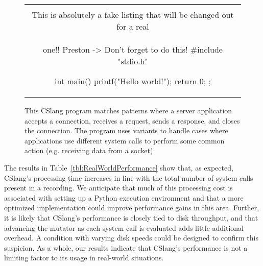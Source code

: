 \begin{figure}[H]
\centering
\begin{tabular}{c}
\begin{lstlisting}
\\ This is absolutely a fake listing that will be changed out for a real
\\ one!!  Preston -> Don't forget to do this!
#include "stdio.h"

int main() {
    printf("Hello world!\n");
    return 0;
};
\end{lstlisting}
\end{tabular}
\caption{This CSlang program matches patterns where a server application
  accepts a connection, receives a request, sends a response, and closes
  the connection.  The program uses variants to handle cases where
  applications use different system calls to perform some common action
  (e.g. receiving data from a socket)}
\label{lst:RealWorldPerformance}
\end{figure}

The results in Table~\ref{tbl:RealWorldPerformance} show that, as expected,
CSlang's
processing time increases in line with the total number of system calls
present in a recording.  We anticipate that much of this processing cost is
associated with setting up a Python execution environment and that a more
optimized implementation could improve performance gains in this area.
Further,
it is likely that CSlang's performance is closely tied to
disk throughput,
and that advancing the mutator
as each system call is evaluated
adds little additional overhead.
A condition with varying disk
speeds could be designed to confirm this suspicion.  As a whole, our
results indicate that CSlang's performance is not a limiting factor to its
usage in real-world situations.

